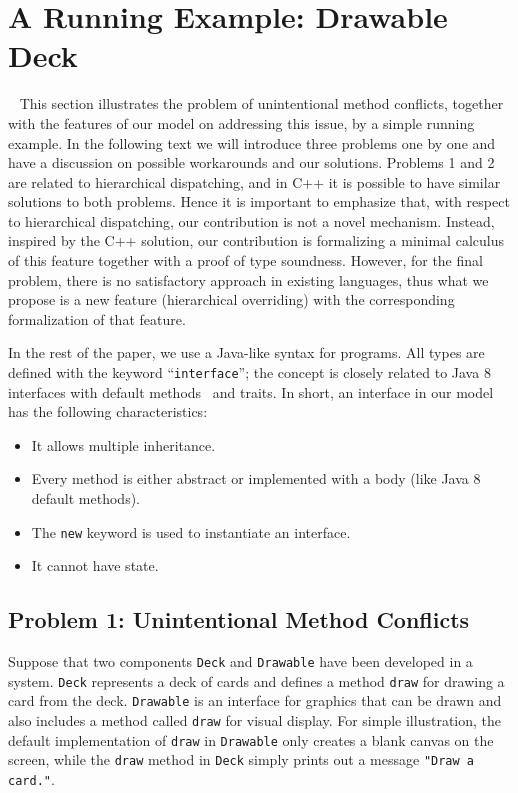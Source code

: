\section{A Running Example: Drawable Deck}~\label{sec:overview}
This section illustrates the problem of unintentional method conflicts,
together with the features of our model on addressing this issue, by
a simple running example. In the following text we will introduce three
problems one by one and have a discussion on possible workarounds and
our solutions.
Problems 1 and 2 are related to hierarchical dispatching, and in 
C++ it is possible to have similar solutions to both
problems. Hence it is important to emphasize that, with respect to
hierarchical dispatching, our contribution is not a novel
mechanism. Instead, 
inspired by the C++ solution, our contribution is formalizing a minimal calculus
of this feature together with a proof of type soundness. However, for the final problem, there is no satisfactory approach
in existing languages, thus what we propose is a new feature (hierarchical
overriding) with the corresponding formalization of that feature.

In the rest of the paper, we use a Java-like syntax for programs. All types are defined with the keyword
``\lstinline|interface|''; the concept is closely related to Java 8
interfaces with default methods~\cite{bono14} and traits. In short, 
an interface in our model has the following characteristics:
\begin{itemize}
	\item It allows multiple inheritance.
	\item Every method is either abstract or implemented with a body (like Java 8 default methods). 
	\item The \lstinline|new| keyword is used to instantiate an interface.
	\item It cannot have state.
\end{itemize}


\subsection{Problem 1: Unintentional Method Conflicts}\label{subsec:problem1}
Suppose that two components \lstinline|Deck| and \lstinline|Drawable| 
have been developed in a system. \lstinline|Deck| represents a deck
of cards and defines a method \lstinline|draw| for drawing a card from the
deck.  \lstinline|Drawable| is an interface for graphics that
can be drawn and also includes a method called \lstinline|draw| for
visual display. For simple illustration, the default implementation of
\lstinline|draw| in \lstinline|Drawable| only creates a blank canvas
on the screen, while the \lstinline|draw| method in \lstinline|Deck| simply
prints out a message \lstinline|"Draw a card."|.


